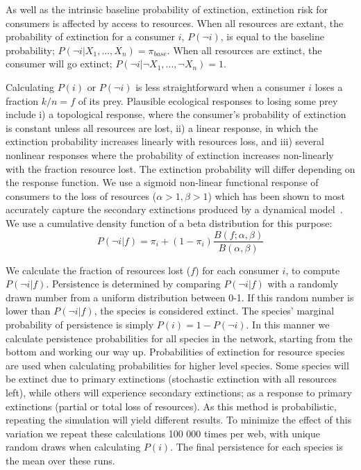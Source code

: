 \documentclass[12pt]{article}
\begin{document}
\begin{spacing}{2.0}
		
		As well as the intrinsic baseline probability of extinction, extinction risk for consumers is affected by access to resources. 
		When all resources are extant, the probability of extinction for a consumer $i$, $P(\lnot i)$, is equal to the baseline probability; $P(\lnot i|X_{1},...,X_{n}) = \pi_{base}$. 
		When all resources are extinct, the consumer will go extinct; $P(\lnot i|\lnot X_{1},...,\lnot X_{n})=1$. 

		Calculating $P(i)$ or $P(\lnot i)$ is less straightforward when a consumer $i$ loses a fraction $k/n = f$ of its prey. 
		Plausible ecological responses to losing some prey include i) a topological response, where the consumer's probability of extinction is constant unless all resources are lost, ii) a linear response, in which the extinction probability increases linearly with resources loss, and iii) several nonlinear responses where the probability of extinction increases non-linearly with the fraction resource lost. 
		The extinction probability will differ depending on the response function. 
		We use a sigmoid non-linear functional response of consumers to the loss of resources ($\alpha >1, \beta >1$) which has been shown to most accurately capture the secondary extinctions produced by a dynamical model~\citep{Eklof2013}. 
		We use a cumulative density function of a beta distribution for this purpose:
		\begin{equation}
		\label{betafunc}
		P(\lnot i|f) = \pi_{i} + (1 - \pi_{i}) \frac{B(f;\alpha,\beta)}{B(\alpha,\beta)}
		\end{equation}

		We calculate the fraction of resources lost ($f$) for each consumer $i$, to compute $P(\lnot i|f)$. 
		Persistence is determined by comparing $P(\lnot i|f)$ with a randomly drawn number from a uniform distribution between 0-1. 
		If this random number is lower than $P(\lnot i|f)$, the species is considered extinct. 
		The species' marginal probability of persistence is simply $P(i) = 1-P(\lnot i)$.
		In this manner we calculate persistence probabilities for all species in the network, starting from the bottom and working our way up. 
		Probabilities of extinction for resource species are used when calculating probabilities for higher level species. 
		Some species will be extinct due to primary extinctions (stochastic extinction with all resources left), while others will experience secondary extinctions; as a response to primary extinctions (partial or total loss of resources). 
		As this method is probabilistic, repeating the simulation will yield different results. 
		To minimize the effect of this variation we repeat these calculations 100 000 times per web, with unique random draws when calculating $P(i)$.
		The final persistence for each species is the mean over these runs. 


\end{spacing}
\end{document}
